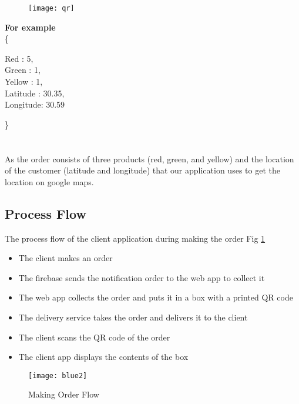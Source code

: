 \par\vspace {4cm}
\begin{wrapfigure}{r}{0.5\textwidth}
    \begin{center}
      \texttt{[image: qr]}
    \end{center}
  \end{wrapfigure}

\textbf{For example}\\
\small \{
    \begin{adjustwidth}{2cm}{}
    \small Red : 5,\\
    \small Green : 1,\\
    \small Yellow : 1,\\
    \small Latitude : 30.35,\\
    \small Longitude: 30.59\\
    \end{adjustwidth}

    \small \}\\\\\\

    As the order consists of three products (red, green, and
    yellow) and the location of the customer (latitude and
    longitude) that our application uses to get the location on
    google maps.

\subsection{Process Flow}

The process flow of the client application during making the order Fig \ref{fig:blue2}
\begin{itemize}
    \item The client makes an order
    \item The firebase sends the notification order to the web app to collect it
    \item The web app collects the order and puts it in a box with a printed QR code
    \item The delivery service takes the order and delivers it to the client
    \item The client scans the QR code of the order
    \item The client app displays the contents of the box
\end{itemize}

\begin{figure}[h]
    \texttt{[image: blue2]}
    \centering
    \caption{Making Order Flow}
    \label{fig:blue2}
\end{figure}



